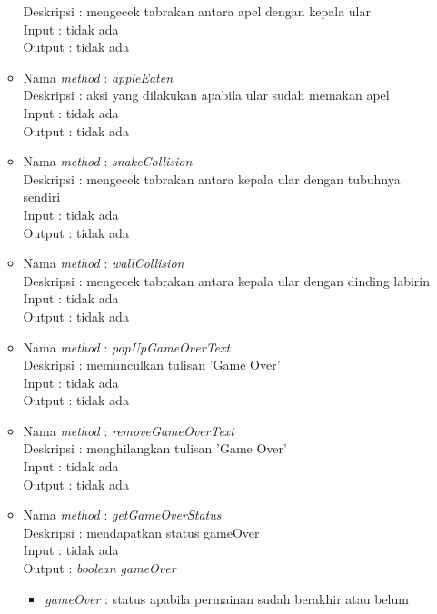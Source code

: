 \begin{enumerate}
\begin{itemize}
				  Deskripsi : mengecek tabrakan antara apel dengan kepala ular\\
				  Input : tidak ada\\
				  Output : tidak ada\\
			\item Nama \textit{method} : \textit{appleEaten}\\
				  Deskripsi : aksi yang dilakukan apabila ular sudah memakan apel\\
				  Input : tidak ada\\
				  Output : tidak ada\\
			\item Nama \textit{method} : \textit{snakeCollision}\\
				  Deskripsi : mengecek tabrakan antara kepala ular dengan tubuhnya sendiri\\
				  Input : tidak ada\\
				  Output : tidak ada\\
			\item Nama \textit{method} : \textit{wallCollision}\\
				  Deskripsi : mengecek tabrakan antara kepala ular dengan dinding labirin\\
				  Input : tidak ada\\
				  Output : tidak ada\\
			\item Nama \textit{method} : \textit{popUpGameOverText}\\
				  Deskripsi : memunculkan tulisan 'Game Over'\\
				  Input : tidak ada\\
				  Output : tidak ada\\
			\item Nama \textit{method} : \textit{removeGameOverText}\\
				  Deskripsi : menghilangkan tulisan 'Game Over'\\
				  Input : tidak ada\\
				  Output : tidak ada\\
			\item Nama \textit{method} : \textit{getGameOverStatus}\\
				  Deskripsi : mendapatkan status gameOver\\
				  Input : tidak ada\\
				  Output : \textit{boolean gameOver}
				  	\begin{itemize}
				  		\item \textit{gameOver} : status apabila permainan sudah berakhir atau belum

\end{itemize}
\end{itemize}
\end{enumerate}
